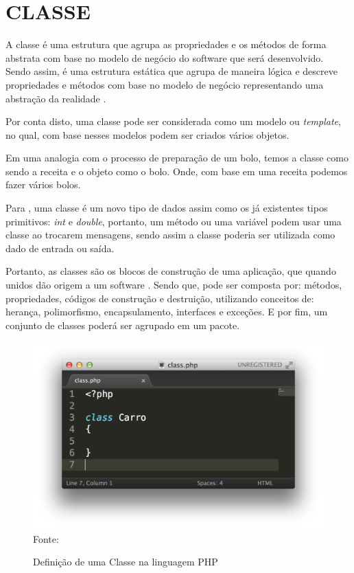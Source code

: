 \section{CLASSE}

A classe é uma estrutura que agrupa as propriedades e os métodos de forma
abstrata com base no modelo de negócio do software que será desenvolvido. 
Sendo assim, é uma estrutura estática que agrupa de maneira lógica e descreve 
propriedades e métodos com base no modelo de negócio representando uma abstração 
da realidade \cite{phpProgramandoComOrientacaoAObjetos}.

Por conta disto, uma classe pode ser considerada como um modelo ou
\textit{template}, no qual, com base nesses modelos podem ser criados vários objetos.

Em uma analogia com o processo de preparação de um bolo, temos a classe como
sendo a receita e o objeto como o bolo. Onde, com base em uma receita podemos fazer 
vários bolos.

Para , uma classe é um novo tipo de dados assim como os já
existentes tipos primitivos: \textit{int} e \textit{double}, portanto, um método
ou uma variável podem usar uma classe ao trocarem mensagens, sendo assim a classe 
poderia ser utilizada como dado de entrada ou saída.

Portanto, as classes são os blocos de construção de uma aplicação, que quando
unidos dão origem a um software \cite{learningJava}. Sendo que, pode ser 
composta por: métodos, propriedades, códigos de construção e destruição, 
utilizando conceitos de: herança, polimorfismo, encapsulamento, interfaces e 
exceções. E por fim, um conjunto de classes poderá ser agrupado em um pacote.

\begin{figure}[h!tb]
	\centering
	\caption{Definição de uma Classe na linguagem PHP}
	\includegraphics[width=\textwidth]{images/class.png}
	\label{fig:classe}
	\centering
	\footnotesize Fonte: \fonteOAutor
\end{figure}

